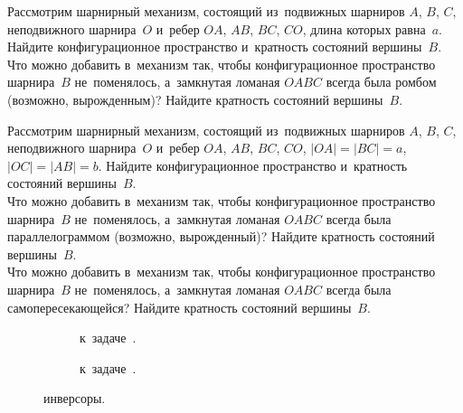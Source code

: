 \begin{problems}

\item
\subproblem
Рассмотрим шарнирный механизм, состоящий из~подвижных шарниров $A$, $B$, $C$,
неподвижного шарнира~$O$ и~ребер $OA$, $AB$, $BC$, $CO$, длина которых
равна~$a$.
Найдите конфигурационное пространство и~кратность состояний вершины~$B$.
\\
\subproblem{}
%
Что можно добавить в~механизм так, чтобы конфигурационное пространство
шарнира~$B$ не~поменялось, а~замкнутая ломаная $OABC$ всегда была ромбом
(возможно, вырожденным)?
Найдите кратность состояний вершины~$B$.

\item
\subproblem
Рассмотрим шарнирный механизм, состоящий из~подвижных шарниров $A$, $B$, $C$,
неподвижного шарнира~$O$ и~ребер $OA$, $AB$, $BC$, $CO$,
$|OA| = |BC| = a$, $|OC| = |AB| = b$.
Найдите конфигурационное пространство и~кратность состояний вершины~$B$.
\\
\subproblem{}
Что можно добавить в~механизм так, чтобы конфигурационное пространство
шарнира~$B$ не~поменялось, а~замкнутая ломаная $OABC$ всегда была
параллелограммом (возможно, вырожденный)?
Найдите кратность состояний вершины~$B$.
\\
\subproblem{}
%
Что можно добавить в~механизм так, чтобы конфигурационное пространство
шарнира~$B$ не~поменялось, а~замкнутая ломаная $OABC$ всегда была
самопересекающейся?
Найдите кратность состояний вершины~$B$.

\begin{figure}[ht]
\strut\hfill
\begin{subfigure}[b]{0.45\linewidth}
\begin{center}
    \caption{к~задаче~.}
\end{center}
\end{subfigure}%
\hfill
\begin{subfigure}[b]{0.35\linewidth}
\begin{center}
    \caption{к~задаче~.}
\end{center}
\end{subfigure}
\hfill\strut
\caption{инверсоры.}
\end{figure}


\end{problems}
